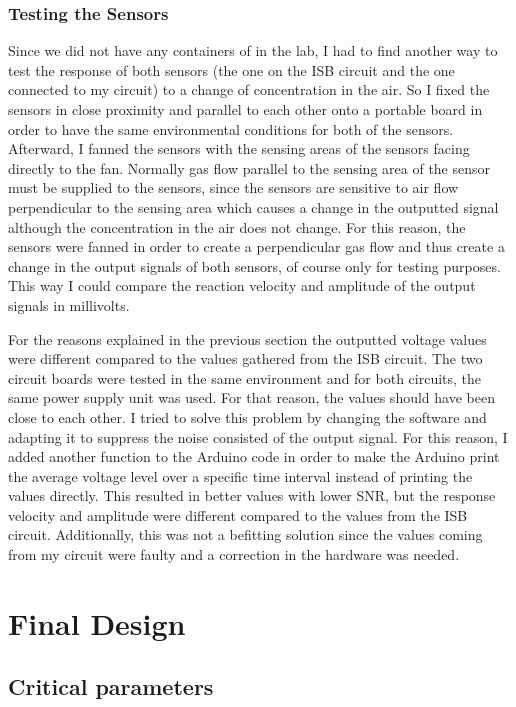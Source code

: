 \subsubsection{Testing the Sensors}
Since we did not have any containers of  in the lab, I had to find another way to test the response of both sensors (the one on the ISB circuit and the one connected to my circuit) to a change of  concentration in the air. So I fixed the sensors in close proximity and parallel to each other onto a portable board in order to have the same environmental conditions for both of the sensors. Afterward, I fanned the sensors with the sensing areas of the sensors facing directly to the fan. Normally gas flow parallel to the sensing area of the sensor must be supplied to the sensors, since the sensors are sensitive to air flow perpendicular to the sensing area which causes a change in the outputted signal although the  concentration in the air does not change. For this reason, the sensors were fanned in order to create a perpendicular gas flow and thus create a change in the output signals of both sensors, of course only for testing purposes. This way I could compare the reaction velocity and amplitude of the output signals in millivolts.\par 
For the reasons explained in the previous section the outputted voltage values were different compared to the values gathered from the ISB circuit. The two circuit boards were tested in the same environment and for both circuits, the same power supply unit was used. For that reason, the values should have been close to each other. I tried to solve this problem by changing the software and adapting it to suppress the noise consisted of the output signal. For this reason, I added another function to the Arduino code in order to make the Arduino print the average voltage level over a specific time interval instead of printing the values directly. This resulted in better values with lower SNR, but the response velocity and amplitude were different compared to the values from the ISB circuit. Additionally, this was not a befitting solution since the values coming from my circuit were faulty and a correction in the hardware was needed.  



\section{Final Design}
\subsection{Critical parameters}
\label{sub:criticalParameters}

